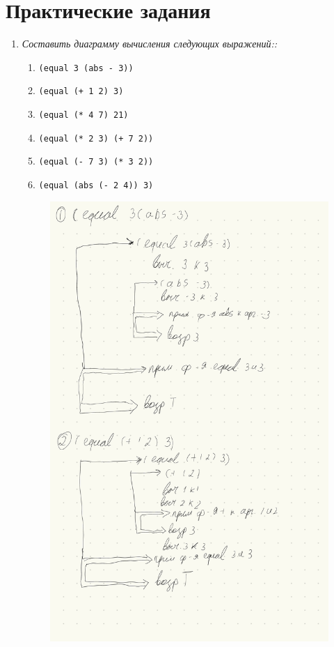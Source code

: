 \chapter{Практические задания}

\begin{enumerate}[wide=0pt]
\item \textit{Составить диаграмму вычисления следующих выражений::}
\begin{enumerate}[label=\arabic*)]
	\item \lstinline {(equal 3 (abs - 3))}
	\item \lstinline {(equal (+ 1 2) 3)}
	\item \lstinline {(equal (* 4 7) 21)}
	\item \lstinline {(equal (* 2 3) (+ 7 2))}
	\item \lstinline {(equal (- 7 3) (* 3 2))}
	\item \lstinline {(equal (abs (- 2 4)) 3)}
	
\end{enumerate}


\begin{figure}[ht!]
	\centering
	\includegraphics[width=1\linewidth]{assets/task1/1.pdf}
\end{figure}
\FloatBarrier


\end{enumerate}
